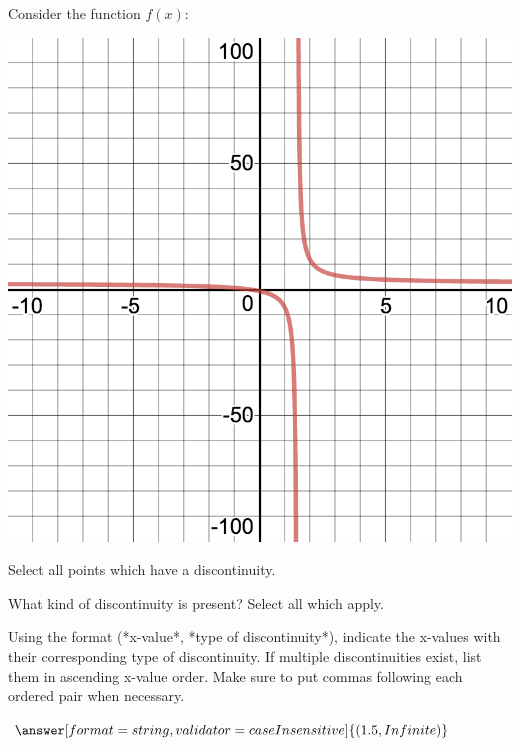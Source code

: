 \documentclass{ximera}
\begin{document}
\begin{question}
Consider the function $f(x)$:
\begin{image}
\includegraphics{continuity3}
\end{image}
Select all points which have a discontinuity.

\begin{selectAll}
\end{selectAll}

What kind of discontinuity is present? Select all which apply.

\begin{selectAll}
\end{selectAll}

Using the format (*x-value*, *type of discontinuity*), indicate the x-values with their corresponding type of discontinuity. If multiple discontinuities exist, list them in ascending x-value order. Make sure to put commas following each ordered pair when necessary.

$\answer[format=string,validator=caseInsensitive]{(1.5, Infinite)}$
\end{question}
\end{document}
